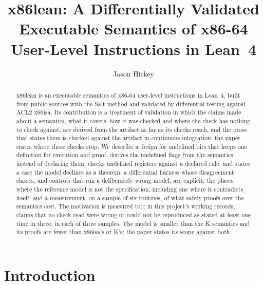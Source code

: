 \documentclass[runningheads]{llncs}
\newcommand{\src}[1]{}  %
\begin{document}
\title{x86lean: A Differentially Validated\\Executable Semantics of x86-64\\User-Level Instructions in Lean~4}
\author{Jason Hickey}

\maketitle

\begin{abstract}
x86lean is an executable semantics of x86-64 user-level instructions in Lean~4, built from public
sources with the Salt method and validated by differential testing against ACL2 x86isa. Its contribution is a treatment of
validation in which the claims made about a semantics, what it covers, how it was checked and where the
check has nothing to check against, are derived from the artifact as far as its checks reach, and the prose that states them is checked against the artifact in continuous integration; the paper states where those checks stop.
We describe a design for undefined bits that keeps one
definition for execution and proof, derives the undefined flags from the semantics instead of declaring
them, checks undefined registers against a declared rule, and states a case the model declines as a theorem; a
differential harness whose disagreement classes, and controls that run a deliberately wrong model, are explicit; the places where
the reference model is not the specification, including one where it contradicts itself; and a
measurement, on a sample of six routines, of what safety proofs over the semantics cost. The motivation is
measured too: in this project's working records, claims that no check read were wrong or could not be
reproduced as stated at least one time in three, in each of three samples. The model is smaller than the K
semantics and its proofs are fewer than x86isa's or K's; the paper states its scope against both.
\src{Each claim is the subject of a section below and is cited there; the six routines: docs/CLAIMS.tsv[proof\_sample\_routines];
the three samples: the section Gated Claims; the declined case: X86/Theorems.lean
step\_dshift\_mem\_undefined\_refuses.}
\end{abstract}

\section{Introduction}
\label{sec:intro}
\end{document}
